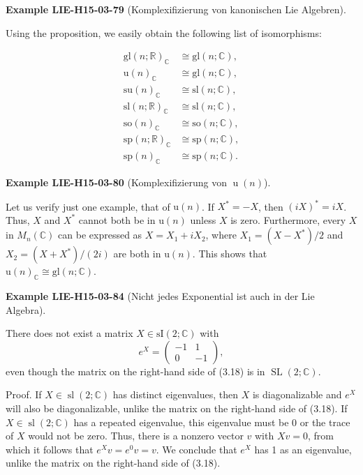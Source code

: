 \documentclass[10pt, letterpaper]{article}
\newcommand{\CustomHeading}[3]{%
  \par\medskip\noindent%
  \textbf{#1 #2} \textnormal{(#3)}.\enskip%
}
\newenvironment{EXA}[2]{\CustomHeading{Example}{#1}{#2}}{}
\begin{document}
\begin{EXA}{LIE-H15-03-79}{Komplexifizierung von kanonischen Lie Algebren}
Using the proposition, we easily obtain the following list of isomorphisms:

$$
\begin{aligned}
\mathrm{gl}(n ; \mathbb{R})_{\mathbb{C}} & \cong \mathrm{gl}(n ; \mathbb{C}), \\
\mathrm{u}(n)_{\mathbb{C}} & \cong \mathrm{gl}(n ; \mathbb{C}), \\
\mathrm{su}(n)_{\mathbb{C}} & \cong \mathrm{sl}(n ; \mathbb{C}), \\
\mathrm{sl}(n ; \mathbb{R})_{\mathbb{C}} & \cong \mathrm{sl}(n ; \mathbb{C}), \\
\mathrm{so}(n)_{\mathbb{C}} & \cong \mathrm{so}(n ; \mathbb{C}), \\
\mathrm{sp}(n ; \mathbb{R})_{\mathbb{C}} & \cong \mathrm{sp}(n ; \mathbb{C}), \\
\mathrm{sp}(n)_{\mathbb{C}} & \cong \mathrm{sp}(n ; \mathbb{C}) .
\end{aligned}
$$
\end{EXA}

\begin{EXA}{LIE-H15-03-80}{Komplexifizierung von $\operatorname{u}(n)$}
Let us verify just one example, that of $\mathrm{u}(n)$. If $X^{*}=-X$, then $(i X)^{*}=i X$. Thus, $X$ and $X^{*}$ cannot both be in $\mathrm{u}(n)$ unless $X$ is zero. Furthermore, every $X$ in $M_{n}(\mathbb{C})$ can be expressed as $X=X_{1}+i X_{2}$, where $X_{1}=\left(X-X^{*}\right) / 2$ and $X_{2}=\left(X+X^{*}\right) /(2 i)$ are both in $\mathrm{u}(n)$. This shows that $\mathrm{u}(n)_{\mathbb{C}} \cong \mathrm{gl}(n ; \mathbb{C})$.
\end{EXA}

\begin{EXA}{LIE-H15-03-84}{Nicht jedes Exponential ist auch in der Lie Algebra}
There does not exist a matrix $X \in \mathrm{sI}(2 ; \mathbb{C})$ with
$$
e^{X}=\left(\begin{array}{rr}
-1 & 1 \\
0 & -1
\end{array}\right),
$$
even though the matrix on the right-hand side of (3.18) is in $\operatorname{SL}(2 ; \mathbb{C})$.


Proof. If $X \in \operatorname{sl}(2 ; \mathbb{C})$ has distinct eigenvalues, then $X$ is diagonalizable and $e^{X}$ will also be diagonalizable, unlike the matrix on the right-hand side of (3.18). If $X \in \operatorname{sl}(2 ; \mathbb{C})$ has a repeated eigenvalue, this eigenvalue must be 0 or the trace of $X$ would not be zero. Thus, there is a nonzero vector $v$ with $X v=0$, from which it follows that $e^{X} v=e^{0} v=v$. We conclude that $e^{X}$ has 1 as an eigenvalue, unlike the matrix on the right-hand side of (3.18).
\end{EXA}
\end{document}
